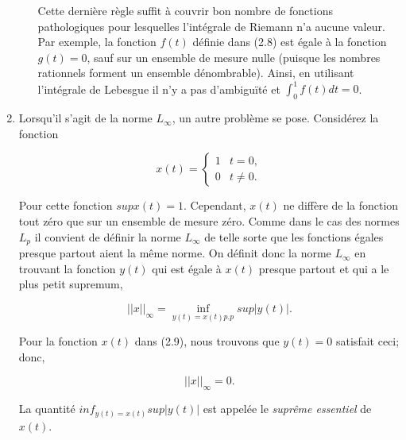 \documentclass[11pt,twoside,a4paper]{article}
\begin{document}
\begin{enumerate}
\begin{enumerate}
    \noindent
    Cette dernière règle suffit à couvrir bon nombre de fonctions pathologiques pour lesquelles l'intégrale de Riemann n'a aucune valeur. Par exemple, la fonction $f(t)$ définie dans (2.8) est égale à la fonction $g(t) = 0$, sauf sur un ensemble de mesure nulle (puisque les nombres rationnels forment un ensemble dénombrable). 
    Ainsi, en utilisant l'intégrale de Lebesgue il n'y a pas d'ambiguïté et $\int_{0}^{1}f(t)dt = 0$.
  \end{enumerate}

  \item Lorsqu'il s'agit de la norme $L_\infty$, un autre problème se pose. Considérez la fonction
  
  \begin{equation}
    x(t) = \begin{cases} 1 & t = 0, \\
      0 &  t \neq 0.
          \end{cases}
  \end{equation}

  \noindent
  Pour cette fonction $sup x(t) = 1$. Cependant, $x(t)$ ne diffère de la fonction tout zéro que sur un ensemble de mesure zéro. Comme dans le cas des normes $L_p$ il convient de définir la norme $L_\infty$ de telle sorte que les fonctions égales presque partout aient la même norme. 
  On définit donc la norme $L_\infty$ en trouvant la fonction $y(t)$ qui est égale à $x(t)$ presque partout et qui a le plus petit supremum,

  \begin{equation*}
    ||x||_{\infty} = \inf_{y(t)=x(t) p.p} sup |y(t)|.
  \end{equation*}

  \noindent
  Pour la fonction $x(t)$ dans (2.9), nous trouvons que $y(t) = 0$ satisfait ceci; donc,

  \begin{equation*}
    ||x||_{\infty} = 0.
  \end{equation*}

  \noindent
  La quantité $inf_{y(t)=x(t)} sup |y(t)|$ est appelée le \textit{suprême essentiel} de $x(t)$.
\end{enumerate}

\end{document}
